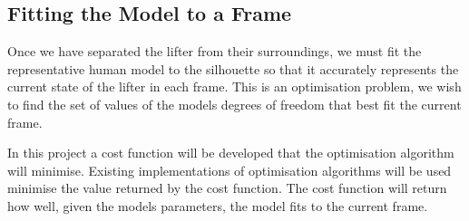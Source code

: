 \subsection{Fitting the Model to a Frame}

Once we have separated the lifter from their surroundings, we must fit the representative human model to the silhouette so that it accurately represents the current state of the lifter in each frame. This is an optimisation problem, we wish to find the set of values of the models degrees of freedom that best fit the current frame.

In this project a cost function will be developed that the optimisation algorithm will minimise. Existing implementations of optimisation algorithms will be used minimise the value returned by the cost function. The cost function will return how well, given the models parameters, the model fits to the current frame.